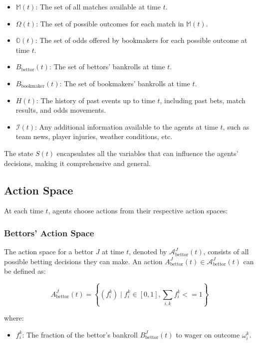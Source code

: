 \begin{itemize}
    \item \( \mathbb{M}(t) \): The set of all matches available at time \( t \).
    \item \( \Omega(t) \): The set of possible outcomes for each match in \( \mathbb{M}(t) \).
    \item \( \mathbb{O}(t) \): The set of odds offered by bookmakers for each possible outcome at time \( t \).
    \item \( B_{\text{bettor}}(t) \): The set of bettors' bankrolls at time \( t \).
    \item \( B_{\text{bookmaker}}(t) \): The set of bookmakers' bankrolls at time \( t \).
    \item \( H(t) \): The history of past events up to time \( t \), including past bets, match results, and odds movements.
    \item \( \mathcal{I}(t) \): Any additional information available to the agents at time \( t \), such as team news, player injuries, weather conditions, etc.
\end{itemize}

The state \( S(t) \) encapsulates all the variables that can influence the agents' decisions, making it comprehensive and general.

\subsection{Action Space}

At each time \( t \), agents choose actions from their respective action spaces:

\subsubsection{Bettors' Action Space}

The action space for a bettor \( J \) at time \( t \), denoted by \( \mathcal{A}_{\text{bettor}}^J(t) \), consists of all possible betting decisions they can make. An action \( A_{\text{bettor}}^J(t) \in \mathcal{A}_{\text{bettor}}^J(t) \) can be defined as:

\[
A_{\text{bettor}}^J(t) = \left\{ \left( f_i^k \right) \mid f_i^k \in [0,1] , \sum_{i,k}f_i^k <= 1\right\}
\]

where:

\begin{itemize}
    \item \( f_i^k \): The fraction of the bettor's bankroll \( B_{\text{bettor}}^J(t) \) to wager on outcome \( \omega_i^k \).
\end{itemize}

